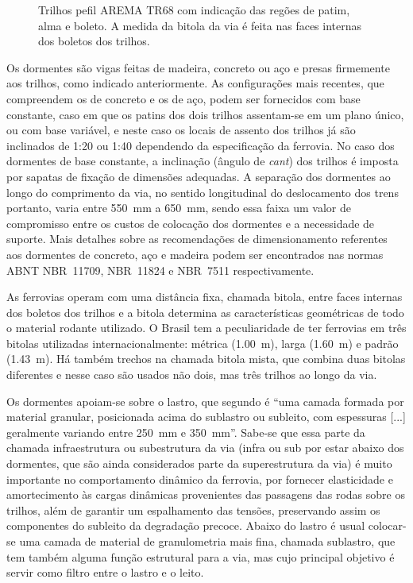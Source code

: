 \begin{figure}
    \centering
    
    \caption{Trilhos pefil AREMA TR68 com indicação das regões de patim, alma e boleto. A medida da bitola da via é feita nas faces internas dos boletos dos trilhos.}
    \label{fig: partes do trilho}
\end{figure}

Os dormentes são vigas feitas de madeira, concreto ou aço e presas firmemente aos trilhos, como indicado anteriormente. As configurações mais recentes, que compreendem os de concreto e os de aço, podem ser fornecidos com base constante, caso em que os patins dos dois trilhos assentam-se em um plano único, ou com base variável, e neste caso os locais de assento dos trilhos já são inclinados de 1:20 ou 1:40 dependendo da especificação da ferrovia. No caso dos dormentes de base constante, a inclinação (ângulo de \textit{cant}) dos trilhos é imposta por sapatas de fixação de dimensões adequadas. A separação dos dormentes ao longo do comprimento da via, no sentido longitudinal do deslocamento dos trens portanto, varia entre \SI{550}{\mm} a \SI{650}{\mm}, sendo essa faixa um valor de compromisso entre os custos de colocação dos dormentes e a necessidade de suporte. Mais detalhes sobre as recomendações de dimensionamento referentes aos dormentes de concreto, aço e madeira podem ser encontrados nas normas ABNT NBR~11709, NBR~11824 e NBR~7511 respectivamente.

As ferrovias operam com uma distância fixa, chamada bitola, entre faces internas dos boletos dos trilhos e a bitola determina as características geométricas de todo o material rodante utilizado. O Brasil tem a peculiaridade de ter ferrovias em três bitolas utilizadas internacionalmente: métrica (\SI{1,00}{\m}), larga (\SI{1,60}{\m}) e padrão (\SI{1,43}{\m}). Há também trechos na chamada bitola mista, que combina duas bitolas diferentes e nesse caso são usados não dois, mas três trilhos ao longo da via.

Os dormentes apoiam-se sobre o lastro, que segundo  é ``uma camada formada por material granular, posicionada acima do sublastro ou subleito, com espessuras [...] geralmente variando entre \SI{250}{\mm} e \SI{350}{\mm}''. Sabe-se que essa parte da chamada infraestrutura ou subestrutura da via (infra ou sub por estar abaixo dos dormentes, que são ainda considerados parte da superestrutura da via) é muito importante no comportamento dinâmico da ferrovia, por fornecer elasticidade e amortecimento às cargas dinâmicas provenientes das passagens das rodas sobre os trilhos, além de garantir um espalhamento das tensões, preservando assim os componentes do subleito da degradação precoce. Abaixo do lastro é usual colocar-se uma camada de material de granulometria mais fina, chamada sublastro, que tem também alguma função estrutural para a via, mas cujo principal objetivo é servir como filtro entre o lastro e o leito.


